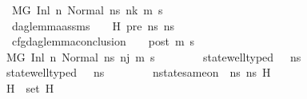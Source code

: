 \begin{isabellebody}
\ \ \ \ \ \ \ \ M{\isacharcomma}{\kern0pt}{\isasymLambda}{\isacharcomma}{\kern0pt}{\isasymGamma}{\isacharcomma}{\kern0pt}{\isasymOmega}{\isacharcomma}{\kern0pt}G\ {\isasymturnstile}{\isacharparenleft}{\kern0pt}Inl\ n{\isacharcomma}{\kern0pt}\ Normal\ ns{}{\isacharparenright}{\kern0pt}\ {\isacharminus}{\kern0pt}n{\isasymrightarrow}{\isacharcircum}{\kern0pt}k\ {\isacharparenleft}{\kern0pt}m{\isacharprime}{\kern0pt}{\isacharcomma}{\kern0pt}\ s{\isacharprime}{\kern0pt}{\isacharparenright}{\kern0pt}\ {\isasymLongrightarrow}\isanewline
\ \ \ \ \ \ \ \ dag{\isacharunderscore}{\kern0pt}lemma{\isacharunderscore}{\kern0pt}assms\ {\isasymLambda}\ {\isasymGamma}\ {\isasymOmega}\ H{}\ pre\ ns{}\ ns{}\ {\isasymLongrightarrow}\ \isanewline
\ \ \ \ \ \ \ \ cfg{\isacharunderscore}{\kern0pt}dag{\isacharunderscore}{\kern0pt}lemma{\isacharunderscore}{\kern0pt}conclusion\ {\isasymLambda}\ {\isasymGamma}\ {\isasymOmega}\ post\ m{\isacharprime}{\kern0pt}\ s{\isacharprime}{\kern0pt}{\isachardoublequoteclose}\ \isanewline
\ \ \ \ \ \ \ {\isachardoublequoteopen}M{\isacharcomma}{\kern0pt}{\isasymLambda}{\isacharcomma}{\kern0pt}{\isasymGamma}{\isacharcomma}{\kern0pt}{\isasymOmega}{\isacharcomma}{\kern0pt}G\ {\isasymturnstile}{\isacharparenleft}{\kern0pt}Inl\ n{\isacharcomma}{\kern0pt}\ Normal\ ns{}{\isacharprime}{\kern0pt}{\isacharprime}{\kern0pt}{\isacharparenright}{\kern0pt}\ {\isacharminus}{\kern0pt}n{\isasymrightarrow}{\isacharcircum}{\kern0pt}j{\isacharprime}{\kern0pt}\ {\isacharparenleft}{\kern0pt}m{\isacharprime}{\kern0pt}{\isacharcomma}{\kern0pt}\ s{\isacharprime}{\kern0pt}{\isacharparenright}{\kern0pt}{\isachardoublequoteclose}\ \isanewline
\ \ \ \ \ \ \ {\isachardoublequoteopen}state{\isacharunderscore}{\kern0pt}well{\isacharunderscore}{\kern0pt}typed\ {\isasymLambda}\ {\isasymOmega}\ ns{}{\isacharprime}{\kern0pt}{\isacharprime}{\kern0pt}{\isachardoublequoteclose}\ \isanewline
\ \ \ \ \ \ \ {\isachardoublequoteopen}state{\isacharunderscore}{\kern0pt}well{\isacharunderscore}{\kern0pt}typed\ {\isasymLambda}\ {\isasymOmega}\ ns{}{\isachardoublequoteclose}\ \isanewline
\ \ \ \ \ \ \ {\isachardoublequoteopen}nstate{\isacharunderscore}{\kern0pt}same{\isacharunderscore}{\kern0pt}on\ {\isasymLambda}\ ns{}\ ns{}{\isacharprime}{\kern0pt}{\isacharprime}{\kern0pt}\ H{}{\isachardoublequoteclose}\ \isanewline
\ \ \ \ \ \ \ {\isachardoublequoteopen}H{}\ {\isasymsubseteq}\ set\ H{}{\isachardoublequoteclose}\ \isanewline

\end{isabellebody}
